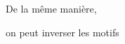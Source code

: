 \documentclass[preview]{standalone}
\begin{document}
\begin{center}
De la même manière,
    
on peut inverser les motifs
\end{center}
\end{document}
